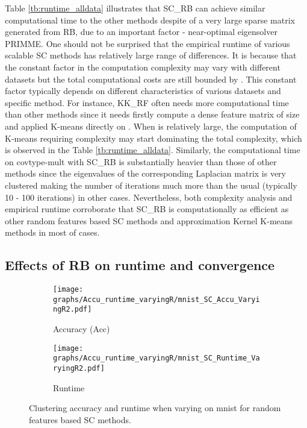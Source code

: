 \documentclass[sigconf]{acmart}
\newcommand{\1}{\boldsymbol{1}}
\newcommand{\0}{\boldsymbol{0}}
\begin{document}
Table \ref{tb:runtime_alldata} illustrates that SC\_RB can achieve similar computational time to the other methods despite of a very large sparse matrix generated from RB, due to an important factor - near-optimal eigensolver PRIMME.
One should not be surprised that the empirical runtime of various scalable SC methods has relatively large range of differences. It is because that the constant factor in the computation complexity may vary with different datasets but the total computational costs are still bounded by . This constant factor typically depends on different characteristics of various datasets and specific method. For instance, KK\_RF often needs more computational time than other methods since it needs firstly compute a dense feature matrix  of  size and applied K-means directly on . When  is relatively large, the computation of K-means requiring  complexity may start dominating the total complexity, which is observed in the Table \ref{tb:runtime_alldata}. Similarly, the computational time on covtype-mult with SC\_RB is substantially heavier than those of other methods since the eigenvalues of the corresponding Laplacian matrix is very clustered making the number of iterations  much more than the usual (typically 10 - 100 iterations) in other cases. Nevertheless, both complexity analysis and empirical runtime corroborate that SC\_RB is computationally as efficient as other random features based SC methods and approximation Kernel K-means methods in most of cases. 


\subsection{Effects of RB on runtime and convergence}

\begin{figure}[!htb]
\centering
	  \begin{subfigure}[b]{0.23\textwidth}
      \texttt{[image: graphs/Accu\_runtime\_varyingR/mnist\_SC\_Accu\_VaryingR2.pdf]}
      \caption{Accuracy (Acc)}
      \label{fig:Accu_varyingR_mnist}
      \end{subfigure}
	  \begin{subfigure}[b]{0.23\textwidth}
      \texttt{[image: graphs/Accu\_runtime\_varyingR/mnist\_SC\_Runtime\_VaryingR2.pdf]}
      \caption{Runtime}
      \label{fig:Runtime_varyingR_mnist}
      \end{subfigure}
\caption{Clustering accuracy and runtime when varying  on mnist for random features based SC methods.}
 \vspace{0mm}
\label{fig:Accu_runtime_varyingR_mnist}
\end{figure}
\end{document}
